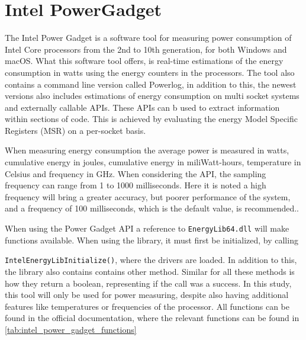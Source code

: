 \section{Intel PowerGadget}

The Intel Power Gadget\cite[]{powergadget} is a software tool for measuring power consumption of Intel Core processors from the 2nd to 10th generation, for both Windows and macOS. What this software tool offers, is real-time estimations of the energy consumption in watts using the energy counters in the processors. 
The tool also contains a command line version called Powerlog, in addition to this, the newest versions also includes estimations of energy consumption on multi socket systems and externally callable APIs. These APIs can b used to extract information within sections of code. This is achieved by evaluating the energy Model Specific Registers (MSR) on a per-socket basis.

When measuring energy consumption the average power is measured in watts, cumulative energy in joules, cumulative energy in miliWatt-hours, temperature in Celsius and frequency in GHz. When considering the API, the sampling frequency can range from 1 to 1000 milliseconds. Here it is noted a high frequency will bring a greater accuracy, but poorer performance of the system, and a frequency of 100 milliseconds, which is the default value, is recommended.\cite*[]{powergadget_api}.

When using the Power Gadget API a reference to \texttt{EnergyLib64.dll} will make functions available. When using the library, it must first be initialized, by calling 

\texttt{IntelEnergyLibInitialize()}, where the drivers are loaded. In addition to this, the library also contains contains other method. Similar for all these methods is how they return a boolean, representing if the call was a success. In this study, this tool will only be used for power measuring, despite also having additional features like temperatures or frequencies of the processor. All functions can be found in the official documentation\cite*[]{powergadget_api}, where the relevant functions can be found in \cref{tab:intel_power_gadget_functions}

